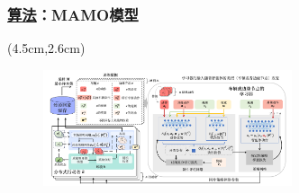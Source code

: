 \begin{frame}
\frametitle{\englishfont \underline{算法}：MAMO模型}
\newBackground
\begin{center}
\begin{textblock*}{\textwidth}(4.5cm,2.6cm)
\begin{figure}
\includegraphics[width=0.65\textwidth]{fig/Fig4-2-solution-model.pdf}
\end{figure}
\end{textblock*}
\end{center}


\end{frame}
